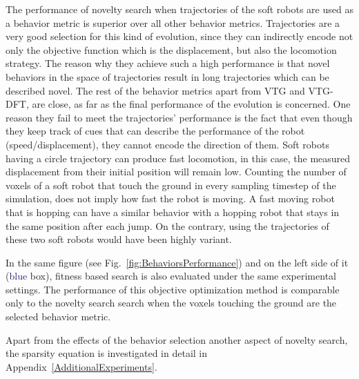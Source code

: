 The performance of novelty search when trajectories of the soft robots are used as a behavior metric is superior over all other behavior metrics. Trajectories are a very good selection for this kind of evolution, since they can indirectly  encode not only the objective function which is the displacement, but also the locomotion strategy. The reason why they achieve such a high performance is that novel behaviors in the space of trajectories result in long trajectories which can be described novel. The rest of the behavior metrics apart from VTG and VTG-DFT, are close, as far as the final performance of the evolution is concerned. One reason they fail to meet the trajectories' performance is the fact that even though they keep track of cues that can describe the performance of the robot (speed/displacement), they cannot encode the direction of them. Soft robots having a circle trajectory can produce fast locomotion, in this case, the measured displacement from their initial position will remain low. Counting the number of voxels of a soft robot that touch the ground in every sampling timestep of the simulation, does not imply how fast the robot is moving. A fast moving robot that is hopping can have a similar behavior with a hopping robot that stays in the same position after each jump. On the contrary, using the trajectories of these two soft robots would have been highly variant. 

In the same figure (see Fig.~\ref{fig:BehaviorsPerformance}) and on the left side of it (\textcolor{MidnightBlue}{blue} box), fitness based search is also evaluated under the same experimental settings. The performance of this objective optimization method is comparable only to the novelty search search when the voxels touching the ground are the selected behavior metric.

Apart from the effects of the behavior selection another aspect of novelty search, the sparsity equation is investigated in detail in Appendix~\ref{AdditionalExperiments}.




